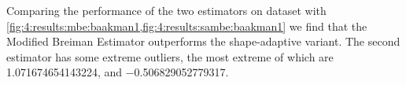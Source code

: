 		Comparing the performance of the two estimators on dataset \baakmanOne with \cref{fig:4:results:mbe:baakman1,fig:4:results:sambe:baakman1} we find that the Modified Breiman Estimator outperforms the shape-adaptive variant. The second estimator has some extreme outliers, the most extreme of which are \num{1.071674654143224}, and \num{-0.506829052779317}. 

